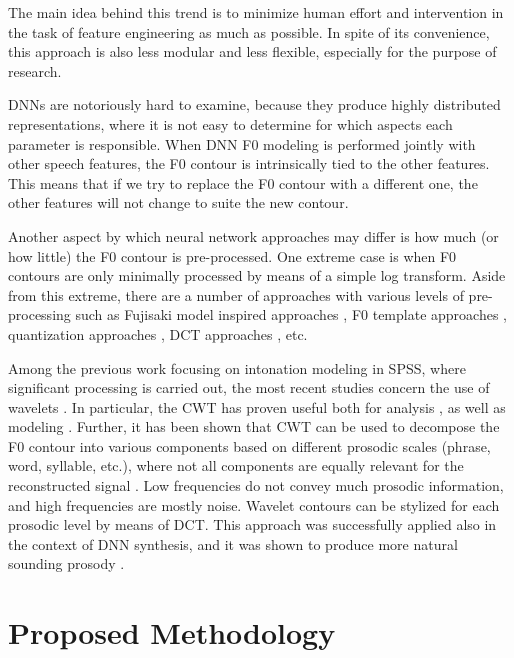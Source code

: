 The main idea behind this trend is to minimize human effort and intervention in the task of feature engineering as much as possible.
In spite of its convenience, this approach is also less modular and less flexible, especially for the purpose of research.

\acp{DNN} are notoriously hard to examine, because they produce highly distributed representations, where it is not easy to determine for which aspects each parameter is responsible.
When \ac{DNN} \ac{F0} modeling is performed jointly with other speech features, the \ac{F0} contour is intrinsically tied to the other features.
This means that if we try to replace the \ac{F0} contour with a different one, the other features will not change to suite the new contour.

Another aspect by which neural network approaches may differ is how much (or how little) the \ac{F0} contour is pre-processed.
One extreme case is when \ac{F0} contours are only minimally processed by means of a simple log transform.
Aside from this extreme, there are a number of approaches with various levels of pre-processing such as Fujisaki model inspired approaches \citep{Sakurai2000Data}, \ac{F0} template approaches \citep{Ronanki2016Template}, quantization approaches \citep{Wang2017RNN}, \ac{DCT} approaches \citep{Yin2016Modeling}, etc. 

Among the previous work focusing on intonation modeling in \ac{SPSS}, where significant processing is carried out, the most recent studies concern the use of wavelets \citep{Suni2013Wavelets, Vainio2013Continuous, Ribeiro2015Multi, Ribeiro2016Wavelet}.
In particular, the \ac{CWT} has proven useful both for analysis \citep{Vainio2013Continuous}, as well as modeling \citep{Suni2013Wavelets}.
Further, it has been shown that \ac{CWT} can be used to decompose the \ac{F0} contour into various components based on different prosodic scales (phrase, word, syllable, etc.), where not all components are equally relevant for the reconstructed signal \citep{Ribeiro2015Multi}.
Low frequencies do not convey much prosodic information, and high frequencies are mostly noise.
Wavelet contours can be stylized for each prosodic level by means of \ac{DCT}.
This approach was successfully applied also in the context of \ac{DNN} synthesis, and it was shown to produce more natural sounding prosody  \citep{Ribeiro2016Wavelet}.



\section{Proposed Methodology}

